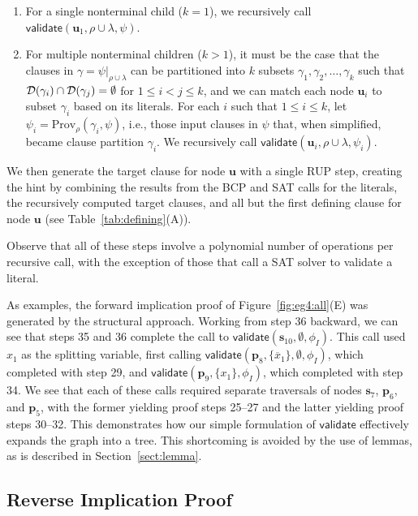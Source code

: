 \documentclass[twoside,11pt]{article}
\newcommand{\obar}[1]{\overline{#1}}
\newcommand{\dependencyset}{{\cal D}}
\newcommand{\passign}{\rho}
\newcommand{\validate}{\textsf{validate}}
\newcommand{\prov}{\textrm{Prov}}
\newcommand{\makenode}[1]{\mathbf{#1}}
\newcommand{\nodeu}{\makenode{u}}
\newcommand{\nodes}{\makenode{s}}
\newcommand{\nodep}{\makenode{p}}
\newcommand{\simplify}[2]{#1|_{#2}}
\begin{document}
\begin{enumerate}
\begin{enumerate}
\item For a single nonterminal child ($k = 1$), we recursively call
  $\validate \left(\nodeu_1, \passign \cup \lambda, \psi\right)$.
\item For multiple nonterminal children ($k > 1$),
  it must be the case that the clauses in
  $\gamma = \simplify{\psi}{\passign \cup \lambda}$ can be partitioned into $k$ subsets
  $\gamma_1, \gamma_2, \ldots, \gamma_k$ such that $\dependencyset(\gamma_i)
  \cap \dependencyset(\gamma_j) = \emptyset$ for $1 \leq i < j \leq k$,
  and we can match each node $\nodeu_i$ to subset $\gamma_i$ based on its
  literals.
  For each $i$ such that $1 \leq i \leq k$, let $\psi_i = \prov_{\passign}(\gamma_i, \psi)$, i.e., those input clauses in $\psi$ that, when simplified, became clause partition $\gamma_i$.
  We recursively call
  $\validate \left(\nodeu_i, \passign \cup \lambda, \psi_i\right)$.
\end{enumerate}
  We then generate the target clause for node $\nodeu$ with a single RUP step,
creating the hint by combining the results from the BCP and SAT calls for
  the literals, the recursively computed target clauses, and all but
  the first defining clause for node $\nodeu$
(see Table~\ref{tab:defining}(A)).
\end{enumerate}
Observe that
all of these steps involve a polynomial number of
operations per recursive call, with the exception of those that call
a SAT solver to validate a literal.

As examples, the forward implication proof of Figure~\ref{fig:eg4:all}(E) was
generated by the structural approach.  Working from step 36 backward,
we can see that steps 35 and 36 complete the call to
$\validate(\nodes_{10}, \emptyset, \phi_I)$.  This call used $x_1$ as
the splitting variable, first calling $\validate(\nodep_{8},
\{\obar{x}_1\}, \emptyset, \phi_I)$, which completed with step 29, and
$\validate(\nodep_{9}, \{x_1\}, \phi_I)$, which completed with step
34.  We see that each of these calls required separate traversals of
nodes $\nodes_7$, $\nodep_6$, and $\nodep_5$, with the former yielding
proof steps 25--27 and the latter yielding proof steps 30--32.  This
demonstrates how our simple formulation of $\validate$ effectively
expands the graph into a tree.  This shortcoming is avoided by the use of lemmas, as is described in Section~\ref{sect:lemma}.

\subsection{Reverse Implication Proof}
\end{document}
